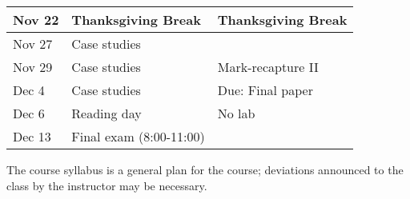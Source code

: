 \documentclass[12pt]{article}
\begin{document}
\begin{center}
\begin{tabular}[c]{lll}
Nov 22     & Thanksgiving Break                 & Thanksgiving Break                   \\
\hline
Nov 27     & Case studies                       &                                      \\
Nov 29     & Case studies                       & Mark-recapture II                    \\
\hline
Dec 4      & Case studies                       & Due: Final paper                     \\
Dec 6      & Reading day                        & No lab                               \\
\hline
Dec 13     & Final exam (8:00-11:00)            &                                      \\
\hline \hline
\end{tabular}
\end{center}

The course syllabus is a general plan for the course; deviations announced to the class by the instructor may be necessary.
\end{document}
